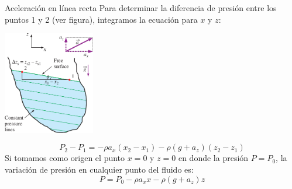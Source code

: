 \documentclass [xcolor=svgnames, t] {beamer}
\begin{document}
\begin{frame}{Aceleraci\'on en l\'inea recta}
\vspace{-0.4cm}
Para determinar la diferencia de presi\'on entre los puntos 1 y 2 (ver figura), integramos la ecuaci\'on para $x$ y $z$:
\begin{center}
\includegraphics[width=0.3\textwidth]{rigi}
\end{center}
$$
P_2 - P_1 = -\rho a_x (x_2 - x_1 ) - \rho(g+ a_z )(z_2 - z_1 )
$$
Si tomamos como origen el punto $x=0$ y $z=0$ en donde la presi\'on $P=P_0$, la variaci\'on de presi\'on en cualquier punto del fluido es:
$$
P = P_0 - \rho a_x x - \rho(g + a_z) z
$$
\end{frame}
\end{document}
